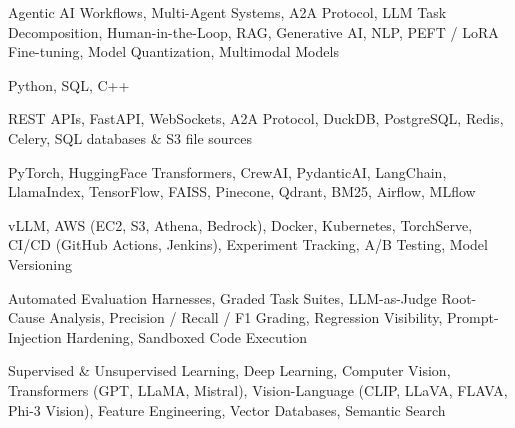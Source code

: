 \documentclass[letter,10pt]{article}
\begin{document}
 Agentic AI Workflows, Multi-Agent Systems, A2A Protocol, LLM Task Decomposition, Human-in-the-Loop, RAG, Generative AI, NLP, PEFT / LoRA Fine-tuning, Model Quantization, Multimodal Models\par\vspace{2pt}

 Python, SQL, C++\par\vspace{2pt}

 REST APIs, FastAPI, WebSockets, A2A Protocol, DuckDB, PostgreSQL, Redis, Celery, SQL databases \& S3 file sources\par\vspace{2pt}

 PyTorch, HuggingFace Transformers, CrewAI, PydanticAI, LangChain, LlamaIndex, TensorFlow, FAISS, Pinecone, Qdrant, BM25, Airflow, MLflow\par\vspace{2pt}

 vLLM, AWS (EC2, S3, Athena, Bedrock), Docker, Kubernetes, TorchServe, CI/CD (GitHub Actions, Jenkins), Experiment Tracking, A/B Testing, Model Versioning\par\vspace{2pt}

 Automated Evaluation Harnesses, Graded Task Suites, LLM-as-Judge Root-Cause Analysis, Precision / Recall / F1 Grading, Regression Visibility, Prompt-Injection Hardening, Sandboxed Code Execution\par\vspace{2pt}

 Supervised \& Unsupervised Learning, Deep Learning, Computer Vision, Transformers (GPT, LLaMA, Mistral), Vision-Language (CLIP, LLaVA, FLAVA, Phi-3 Vision), Feature Engineering, Vector Databases, Semantic Search
\end{document}
